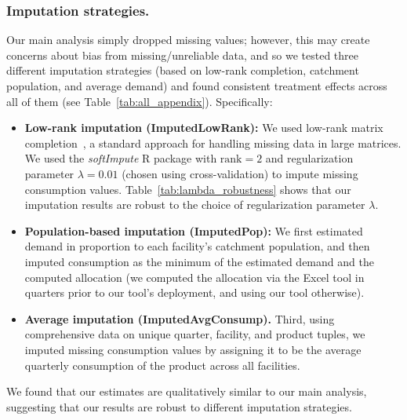 \documentclass[12pt]{article}
\begin{document}
\subsubsection{Imputation strategies.} Our main analysis simply dropped missing values; however, this may create concerns about bias from missing/unreliable data, and so we tested three different imputation strategies (based on low-rank completion, catchment population, and average demand) and found consistent treatment effects across all of them (see Table~\ref{tab:all_appendix}). Specifically:
\begin{itemize}
\item \textbf{Low-rank imputation (ImputedLowRank):} We used low-rank matrix completion~\cite{candes2012exact}, a standard approach for handling missing data in large matrices. We used the \textit{softImpute} R package with $\text{rank}=2$ and regularization parameter $\lambda=0.01$ (chosen using cross-validation) to impute missing consumption values. Table~\ref{tab:lambda_robustness} shows that our imputation results are robust to the choice of regularization parameter $\lambda$.
\item \textbf{Population-based imputation (ImputedPop):} We first estimated demand in proportion to each facility’s catchment population, and then imputed consumption as the minimum of the estimated demand and the computed allocation (we computed the allocation via the Excel tool in quarters prior to our tool's deployment, and using our tool otherwise).
\item \textbf{Average imputation (ImputedAvgConsump).} Third, using comprehensive data on unique quarter, facility, and product tuples, we imputed missing consumption values by assigning it to be the average quarterly consumption of the product across all facilities.
\end{itemize}
We found that our estimates are qualitatively similar to our main analysis, suggesting that our results are robust to different imputation strategies.
\end{document}
